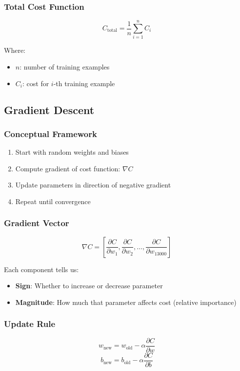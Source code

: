 \documentclass[11pt,a4paper]{article}
\begin{document}
\subsubsection{Total Cost Function}
\[
C_{\text{total}} = \frac{1}{n} \sum_{i=1}^{n} C_i
\]

Where:
\begin{itemize}
    \item $n$: number of training examples
    \item $C_i$: cost for $i$-th training example
\end{itemize}

\subsection{Gradient Descent}

\subsubsection{Conceptual Framework}
\begin{enumerate}
    \item Start with random weights and biases
    \item Compute gradient of cost function: $\nabla C$
    \item Update parameters in direction of negative gradient
    \item Repeat until convergence
\end{enumerate}

\subsubsection{Gradient Vector}
\[
\nabla C = \left[\frac{\partial C}{\partial w_1}, \frac{\partial C}{\partial w_2}, \ldots, \frac{\partial C}{\partial w_{13000}}\right]
\]

Each component tells us:
\begin{itemize}
    \item \textbf{Sign}: Whether to increase or decrease parameter
    \item \textbf{Magnitude}: How much that parameter affects cost (relative importance)
\end{itemize}

\subsubsection{Update Rule}
\[
w_{\text{new}} = w_{\text{old}} - \alpha \frac{\partial C}{\partial w}
\]
\[
b_{\text{new}} = b_{\text{old}} - \alpha \frac{\partial C}{\partial b}
\]
\end{document}
